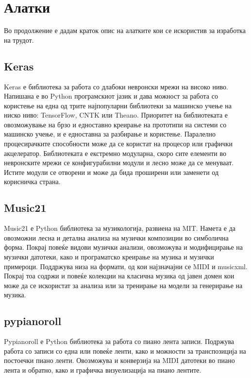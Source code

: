 \chapter{Алатки}
\label{ch:alatki}

Во продолжение е дадам краток опис на алатките кои се искористив за изработка на трудот.

\section{Keras}

Keras е библиотека за работа со длабоки невронски мрежи на високо ниво. Напишана е во Python програмскиот јазик и дава можност за работа со користење на една од трите најпопуларни библиотеки за машинско учење на ниско ниво: TensorFlow, CNTK или Theano. Приоритет на библиотеката е овозможување на брзо и едноставно креирање на прототипи на системи со машинско учење, и е едноставна за разбирање и користење. Паралелно процесирачките способности може да се користат на процесор или графички акцелератор. Библиотеката е екстремно модуларна, скоро сите елементи во невронските мрежи се конфигурабилни модули и лесно може да се менуваат. Истите модули се отворени и може да бида проширени или заменети од корисничка страна.

\section{Music21}

Music21 е Python библиотека за музикологија, развиена на MIT. Намета е да овозможни лесна и детална анализа на музички композиции во симболична форма. Покрај повеќе видови музички анализи, овозможува и модифицирање на музички датотеки, како и програматско креирање на музика и музички примероци. Поддржува низа на формати, од кои најзначајни се MIDI и musicxml. Покрај тоа содржи и повеќе колекции на класична музика од јавен домен кои може да се искористат за анализа или за тренирање на модели за генерирање на музика. 

\section{pypianoroll}

Pypianoroll е Python библиотека за работа со пиано лента записи. Подржува работа со записи со една или повеќе ленти, како и можности за транспозиција на постоечки пиано ленти. Овозможува и конверзија на MIDI датотеки во пиано лента и обратно, како и графичка визуелизација на пиано лентите.

